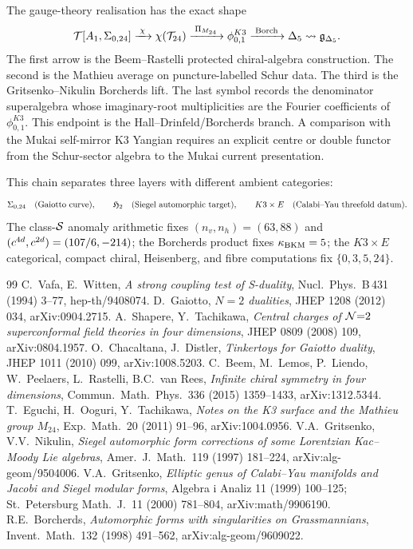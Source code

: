 The gauge-theory realisation has the exact shape
\[
  \mathcal{T}[A_1,\Sigma_{0,24}]
  \xrightarrow{\;\chi\;}
  \chi(\mathcal{T}_{24})
  \xrightarrow{\;\Pi_{M_{24}}\;}
  \phi_{0,1}^{K3}
  \xrightarrow{\;\mathrm{Borch}\;}
  \Delta_5
  \rightsquigarrow
  \mathfrak g_{\Delta_5}.
\]
The first arrow is the Beem--Rastelli protected chiral-algebra
construction.  The second is the Mathieu average on puncture-labelled
Schur data.  The third is the Gritsenko--Nikulin Borcherds lift.  The
last symbol records the denominator superalgebra whose imaginary-root
multiplicities are the Fourier coefficients of
\(\phi_{0,1}^{K3}\).
This endpoint is the Hall--Drinfeld/Borcherds branch.  A comparison
with the Mukai self-mirror K3 Yangian requires an explicit centre or
double functor from the Schur-sector algebra to the Mukai current
presentation.

This chain separates three layers with different ambient categories:
\[
  \Sigma_{0,24}
  \quad\hbox{(Gaiotto curve)},\qquad
  \mathfrak H_2
  \quad\hbox{(Siegel automorphic target)},\qquad
  K3\times E
  \quad\hbox{(Calabi--Yau threefold datum)}.
\]
The class-\(\mathcal{S}\) anomaly arithmetic fixes \((n_v,n_h)=(63,88)\) and
\((c^{4d},c^{2d})=(107/6,-214)\); the Borcherds product fixes
\(\kappa_{\mathrm{BKM}}=5\); the \(K3\times E\) categorical, compact chiral,
Heisenberg, and fibre computations fix \(\{0,3,5,24\}\).

\begin{thebibliography}{99}
 C.\ Vafa, E.\ Witten, \emph{A strong coupling
  test of S-duality}, Nucl.\ Phys.\ B\,431 (1994) 3--77, hep-th/9408074.
 D.\ Gaiotto, \emph{$N=2$ dualities}, JHEP 1208
  (2012) 034, arXiv:0904.2715.
 A.\ Shapere, Y.\ Tachikawa,
  \emph{Central charges of $\mathcal{N}{=}2$ superconformal field theories in four
  dimensions}, JHEP 0809 (2008) 109, arXiv:0804.1957.
 O.\ Chacaltana, J.\ Distler,
  \emph{Tinkertoys for Gaiotto duality}, JHEP 1011 (2010) 099,
  arXiv:1008.5203.
 C.\ Beem, M.\ Lemos, P.\ Liendo, W.\ Peelaers,
  L.\ Rastelli, B.C.\ van Rees, \emph{Infinite chiral symmetry in four
  dimensions}, Commun.\ Math.\ Phys.\ 336 (2015) 1359--1433,
  arXiv:1312.5344.
 T.\ Eguchi, H.\ Ooguri,
  Y.\ Tachikawa, \emph{Notes on the K3 surface and the Mathieu group
  $M_{24}$}, Exp.\ Math.\ 20 (2011) 91--96, arXiv:1004.0956.
 V.A.\ Gritsenko, V.V.\ Nikulin,
  \emph{Siegel automorphic form corrections of some Lorentzian
  Kac--Moody Lie algebras}, Amer.\ J.\ Math.\ 119 (1997) 181--224,
  arXiv:alg-geom/9504006.
 V.A.\ Gritsenko, \emph{Elliptic genus of
  Calabi--Yau manifolds and Jacobi and Siegel modular forms},
  Algebra i Analiz 11 (1999) 100--125; St.\ Petersburg Math.\ J.\ 11
  (2000) 781--804, arXiv:math/9906190.
 R.E.\ Borcherds, \emph{Automorphic forms with
  singularities on Grassmannians}, Invent.\ Math.\ 132 (1998) 491--562,
  arXiv:alg-geom/9609022.
\end{thebibliography}
